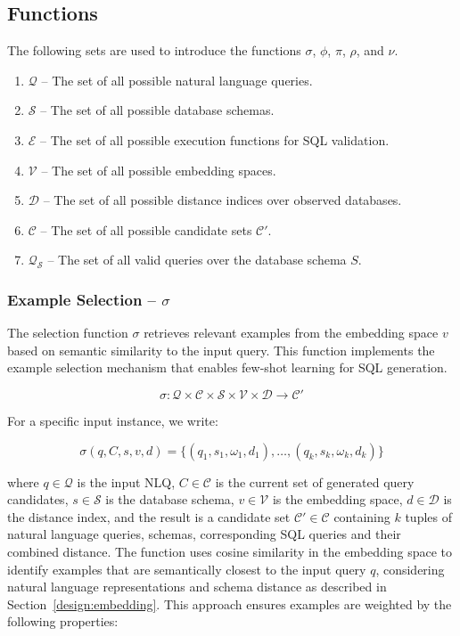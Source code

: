 \subsection{Functions}\label{design:components}

The following sets are used to introduce the functions $\sigma$, $\phi$, $\pi$, $\rho$, and $\nu$.

\begin{enumerate}
    \item $\mathcal{Q}$ – The set of all possible natural language queries.
    \item $\mathcal{S}$ – The set of all possible database schemas.
    \item $\mathcal{E}$ – The set of all possible execution functions for SQL validation.
    \item $\mathcal{V}$ – The set of all possible embedding spaces.
    \item $\mathcal{D}$ – The set of all possible distance indices over observed databases.
    \item $\mathcal{C}$ – The set of all possible candidate sets $\mathcal{C}'$.
    \item $\mathcal{Q}_{\mathcal{S}}$ – The set of all valid queries over the database schema $S$.
\end{enumerate}

\subsubsection{Example Selection – $\sigma$}\label{design:selection-function}

The selection function $\sigma$ retrieves relevant examples from the
embedding space $v$ based on semantic similarity to the
input query. This function implements the example selection mechanism
that enables few-shot learning for SQL generation.

$$
\sigma: \mathcal{Q} \times \mathcal{C} \times \mathcal{S} \times \mathcal{V} \times \mathcal{D} \rightarrow \mathcal{C}'
$$

\vspace{0.5em}

For a specific input instance, we write:

$$
\sigma(q, C, s, v, d) = \{(q_1, s_1, \omega_1, d_1), \ldots, (q_k, s_k, \omega_k, d_k)\}
$$

\vspace{0.5em}

where $q \in \mathcal{Q}$ is the input NLQ, $C \in \mathcal{C}$ is the current
set of generated query candidates, $s \in \mathcal{S}$ is the database schema,
$v \in \mathcal{V}$ is the embedding space, $d \in \mathcal{D}$ is the distance
index, and the result is a candidate set $\mathcal{C}' \in \mathcal{C}$
containing $k$ tuples of natural language queries, schemas, corresponding SQL
queries and their combined distance. The function uses cosine similarity in the
embedding space to identify examples that are semantically closest to the input
query $q$, considering natural language representations and schema distance as
described in Section~\ref{design:embedding}. This approach ensures examples are
weighted by the following properties:

